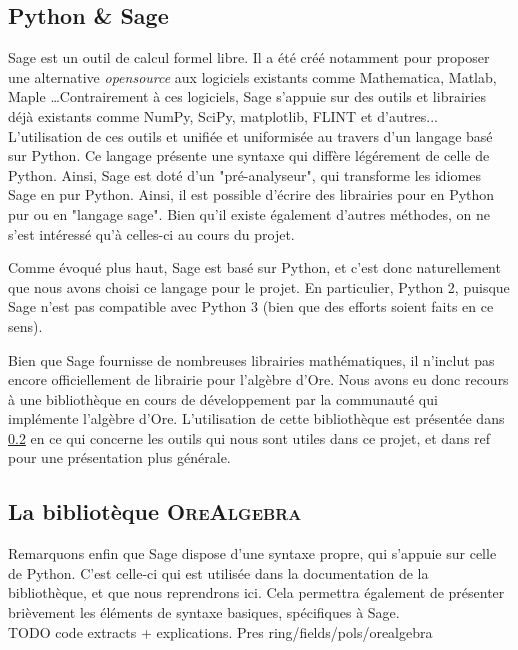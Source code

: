 \documentclass[12pt]{article}
\begin{document}
    \subsection{Python \& Sage}
        \label{ssec:sage}
        \par Sage est un outil de calcul formel libre.
        Il a été créé notamment pour proposer
        une alternative \textit{opensource} aux logiciels existants comme Mathematica,
        Matlab, Maple \ldots Contrairement à ces logiciels, Sage s'appuie sur des outils
        et librairies déjà existants comme NumPy, SciPy, matplotlib, FLINT et d'autres...
        L'utilisation de ces outils et unifiée et uniformisée au travers d'un langage
        basé sur Python. Ce langage présente une syntaxe qui diffère légérement de celle
        de Python. Ainsi, Sage est doté d'un "pré-analyseur",
        qui transforme les idiomes Sage en pur Python.
        Ainsi, il est possible d'écrire des librairies pour en Python pur ou en "langage sage".
        Bien qu'il existe également d'autres méthodes, on ne s'est intéressé qu'à celles-ci au
        cours du projet.
        \par Comme évoqué plus haut, Sage est basé sur Python, et c'est donc naturellement
        que nous avons choisi ce langage pour le projet.
        En particulier, Python 2, puisque Sage n'est pas compatible avec Python 3
        (bien que des efforts soient faits en ce sens).
        \par Bien que Sage fournisse de nombreuses librairies mathématiques,
        il n'inclut pas encore officiellement de librairie pour l'algèbre d'Ore.
        Nous avons eu donc recours à une bibliothèque en cours de développement par
        la communauté qui implémente l'algèbre d'Ore. L'utilisation de cette bibliothèque
        est présentée dans \ref{sec:libore} en ce qui concerne les outils qui nous sont utiles dans
        ce projet, et dans {\color{red} ref} pour une présentation plus générale.
    \subsection{La bibliotèque \textsc{OreAlgebra}}
        \label{sec:libore}
        \par Remarquons enfin que Sage dispose d'une syntaxe propre, qui s'appuie sur celle de Python.
        C'est celle-ci qui est utilisée dans la documentation de la bibliothèque, et que nous
        reprendrons ici. Cela permettra également de présenter brièvement les éléments de syntaxe
        basiques, spécifiques à Sage.\\
        {\color{red} TODO code extracts + explications. Pres ring/fields/pols/orealgebra}
\end{document}

